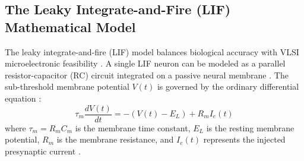 \documentclass[11pt]{article}
\begin{document}
\subsection{The Leaky Integrate-and-Fire (LIF) Mathematical Model}
The leaky integrate-and-fire (LIF) model balances biological accuracy with VLSI microelectronic feasibility \cite{schuman2017survey,mead1990neuromorphic}. A single LIF neuron can be modeled as a parallel resistor-capacitor (RC) circuit integrated on a passive neural membrane \cite{davies2021loihi,davies2018loihi}. The sub-threshold membrane potential $V(t)$ is governed by the ordinary differential equation \cite{davies2021loihi}:
$$\tau_m \frac{dV(t)}{dt} = -(V(t) - E_L) + R_m I_e(t)$$
where $\tau_m = R_m C_m$ is the membrane time constant, $E_L$ is the resting membrane potential, $R_m$ is the membrane resistance, and $I_e(t)$ represents the injected presynaptic current \cite{davies2021loihi}.
\end{document}
